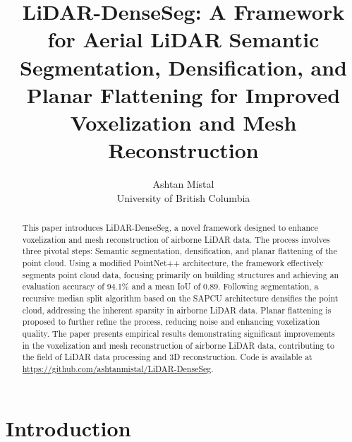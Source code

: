 \documentclass[10pt,twocolumn,letterpaper]{article}
\begin{document}
    \title{LiDAR-DenseSeg: A Framework for Aerial LiDAR Semantic Segmentation, Densification, and Planar Flattening for Improved Voxelization and Mesh Reconstruction}
    \author{Ashtan Mistal\\
    University of British Columbia
    }

    \maketitle


    \begin{abstract}
        This paper introduces LiDAR-DenseSeg, a novel framework designed to enhance voxelization and mesh reconstruction of airborne LiDAR data. The process involves three pivotal steps: Semantic segmentation, densification, and planar flattening of the point cloud. Using a modified PointNet++ architecture, the framework effectively segments point cloud data, focusing primarily on building structures and achieving an evaluation accuracy of 94.1\% and a mean IoU of 0.89.
        Following segmentation, a recursive median split algorithm based on the SAPCU architecture densifies the point cloud, addressing the inherent sparsity in airborne LiDAR data. Planar flattening is proposed to further refine the process, reducing noise and enhancing voxelization quality. The paper presents empirical results demonstrating significant improvements in the voxelization and mesh reconstruction of airborne LiDAR data, contributing to the field of LiDAR data processing and 3D reconstruction.
        Code is available at \url{https://github.com/ashtanmistal/LiDAR-DenseSeg}.
\end{abstract}

    \section{Introduction}\label{sec:introduction}
\end{document}
